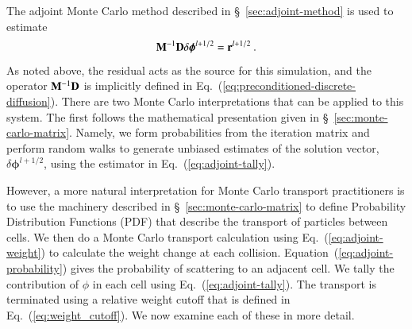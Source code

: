 \documentclass[preprint,12pt]{elsarticle}
\newcommand{\vr}{\ensuremath{\ve{r}}}
\newcommand{\bphi}{\ensuremath{\boldsymbol{\phi}}}
\begin{document}
The adjoint Monte Carlo method described in \S~\ref{sec:adjoint-method} is
used to estimate
\begin{equation}
  \ve{M}^{-1}\ve{D}\delta\bphi^{l+1/2} = \vr^{l+1/2}\:.
\end{equation}
As noted above, the residual acts as the source for this simulation, and the
operator $\mathbf{M}^{-1}\mathbf{D}$ is implicitly defined in
Eq.~(\ref{eq:preconditioned-discrete-diffusion}).  There are two Monte Carlo
interpretations that can be applied to this system.  The first follows the
mathematical presentation given in \S~\ref{sec:monte-carlo-matrix}.  Namely,
we form probabilities from the iteration matrix and perform random walks to
generate unbiased estimates of the solution vector, $\delta\bphi^{l+1/2}$,
using the estimator in Eq.~(\ref{eq:adjoint-tally}).

However, a more natural interpretation for Monte Carlo transport practitioners
is to use the machinery described in \S~\ref{sec:monte-carlo-matrix} to define
Probability Distribution Functions (PDF) that describe the transport of
particles between cells.  We then do a Monte Carlo transport calculation using
Eq.~(\ref{eq:adjoint-weight}) to calculate the weight change at each
collision. Equation~(\ref{eq:adjoint-probability}) gives the probability of
scattering to an adjacent cell. We tally the contribution of $\phi$ in each
cell using Eq.~(\ref{eq:adjoint-tally}).  The transport is terminated using a
relative weight cutoff that is defined in Eq.~(\ref{eq:weight_cutoff}).  We
now examine each of these in more detail.
\end{document}
